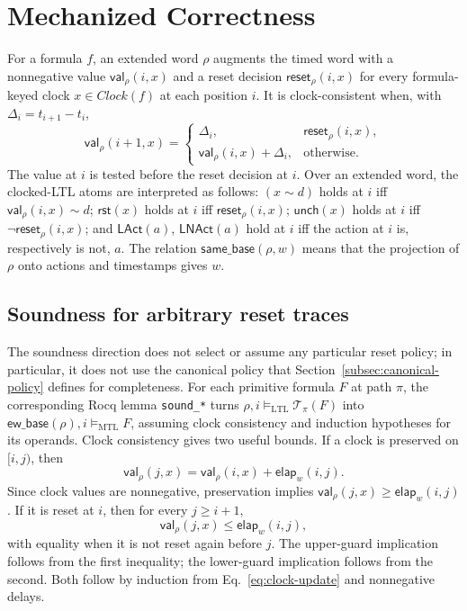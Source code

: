 \documentclass{ieeeaccess}
\newcommand{\satM}{\models_{\mathrm{MTL}}}
\newcommand{\satL}{\models_{\mathrm{LTL}}}
\newcommand{\Reset}{\mathsf{rst}}
\newcommand{\Unch}{\mathsf{unch}}
\newcommand{\T}{\mathcal{T}}
\newcommand{\CVal}{\mathsf{val}}
\newcommand{\CReset}{\mathsf{reset}}
\newcommand{\elapsed}{\mathsf{elap}}
\newcommand{\ewbase}{\mathsf{ew\_base}}
\newcommand{\Clock}{\mathit{Clock}}
\begin{document}


\section{Mechanized Correctness}
\label{sec:correctness}
\label{sec:encoding-correctness}
For a formula $f$, an extended word $\rho$ augments the timed word with a
nonnegative value $\CVal_\rho(i,x)$ and a reset decision
$\CReset_\rho(i,x)$ for every formula-keyed clock $x\in\Clock(f)$ at each
position $i$. It is clock-consistent when, with
$\Delta_i=t_{i+1}-t_i$,
\begin{equation}
\CVal_\rho(i+1,x)=
\begin{cases}
\Delta_i,&\CReset_\rho(i,x),\\
\CVal_\rho(i,x)+\Delta_i,&\text{otherwise.}
\end{cases}
\label{eq:clock-update}
\end{equation}
The value at $i$ is tested before the reset decision at $i$.
Over an extended word, the clocked-LTL atoms are interpreted as follows:
$(x\sim d)$ holds at $i$ iff $\CVal_\rho(i,x)\sim d$; $\Reset(x)$ holds at $i$
iff $\CReset_\rho(i,x)$; $\Unch(x)$ holds at $i$ iff $\neg\CReset_\rho(i,x)$;
and $\mathsf{LAct}(a)$, $\mathsf{LNAct}(a)$ hold at $i$ iff the action at $i$
is, respectively is not, $a$. The relation
$\mathsf{same\_base}(\rho,w)$ means that the projection of $\rho$ onto actions
and timestamps gives $w$.

\subsection{Soundness for arbitrary reset traces}
\label{subsec:primitive-soundness}
The soundness direction does not select or assume any particular reset
policy; in particular, it does not use the canonical policy that
Section~\ref{subsec:canonical-policy} defines for completeness. For
each primitive formula $F$ at path $\pi$, the corresponding Rocq lemma
\texttt{sound\_*} turns $\rho,i\satL\T_\pi(F)$ into
$\ewbase(\rho),i\satM F$, assuming clock consistency and
induction hypotheses for its operands. 
Clock consistency gives two useful bounds. If a clock is preserved on
$[i,j)$, then
\[
\CVal_\rho(j,x)=\CVal_\rho(i,x)+\elapsed_w(i,j).
\]
Since clock values are nonnegative, preservation implies
$\CVal_\rho(j,x)\ge\elapsed_w(i,j)$. If it is reset at $i$, then for every
$j\ge i+1$,
\[
\CVal_\rho(j,x)\le\elapsed_w(i,j),
\]
with equality when it is not reset again before $j$. The upper-guard
implication follows from the first inequality; the lower-guard implication
follows from the second. Both follow by induction from
Eq.~\eqref{eq:clock-update} and nonnegative delays.
\end{document}
